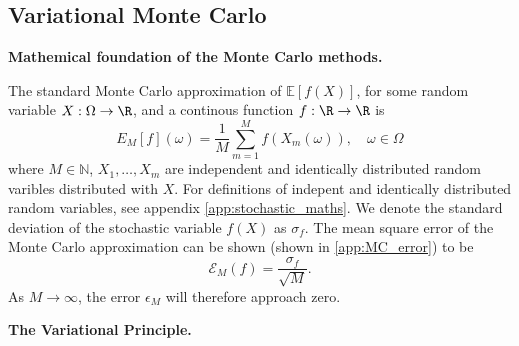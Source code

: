 

\subsection*{Variational Monte Carlo}

\textbf{Mathemical foundation of the Monte Carlo methods.}

The standard Monte Carlo approximation of $\mathbb{E}[f(X)]$, for some random variable $X:\Omega\to\R$, and a continous function $f:\R\to\R$ is
\begin{equation}
    E_M[f](\omega)= \frac{1}{M}\sum_{m=1}^Mf(X_m(\omega)), \quad \omega\in\Omega
\end{equation}
where $M\in\mathbb{N}$, $X_1, \dots, X_m$ are independent and identically distributed random varibles distributed with $X$. For definitions of indepent and identically distributed random variables, see appendix \ref{app:stochastic_maths}. We denote the standard deviation of the stochastic variable $f(X)$ as $\sigma_f$. The mean square error of the Monte Carlo approximation can be shown (shown in \ref{app:MC_error}) to be 
\begin{equation}
    \mathcal{E}_M(f) = \frac{\sigma_f}{\sqrt{M}}. 
\end{equation}
As $M\to\infty$, the error $\epsilon_M$ will therefore approach zero.

\textbf{The Variational Principle.}


